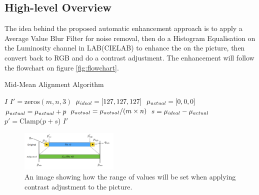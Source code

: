 \documentclass[journal,transmag]{IEEEtran}
\begin{document}
\subsection{High-level Overview}
The idea behind the proposed automatic enhancement approach is to apply a Average Value Blur Filter for noise removal, then do a Histogram Equalisation on the Luminosity channel in LAB(CIELAB) to enhance the on the picture, then convert back to RGB and do a contrast adjustment. The enhancement will follow the flowchart on figure \ref{fig:flowchart}.


\begin{algorithm}[tp!]
\caption{Mid-Mean Alignment Algorithm}
\label{alg:mma}
\begin{algorithmic}[1]
 {$I$} 
	\State $I' = \mbox{zeros}(m, n, 3)$
	\State $\mu_{\mbox{\tiny{ideal}}} = [127, 127, 127]$
	\State $\mu_{\mbox{\tiny{actual}}} = [0, 0, 0]$
	\State 
		\State $\mu_{\mbox{\tiny{actual}}} = \mu_{\mbox{\tiny{actual}}} + p$
	\EndFor
	\State
	\State $\mu_{\mbox{\tiny{actual}}} = \mu_{\mbox{\tiny{actual}}} / (m \times n)$
	\State $s = \mu_{\mbox{\tiny{ideal}}} - \mu_{\mbox{\tiny{actual}}}$
	\State 
		\State $p' = \mbox{Clamp(}p + s$)
	\EndFor
	\State 
	\State
	\Return $I'$
\EndFunction
\end{algorithmic}
\end{algorithm}

\begin{figure}[b]
\centering
\includegraphics[width=0.42\textwidth]{figures/contrAdj.png}
\caption{An image showing how the range of values will be set when applying contrast adjustment to the picture.}
\label{fig:contrAdj}
\end{figure}
\end{document}

